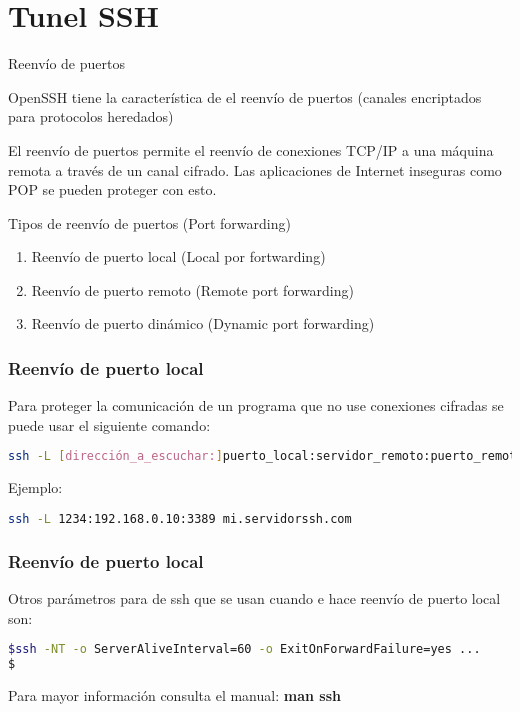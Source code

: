 \section{Tunel SSH}

\begin{frame}[c]{Reenvío de puertos}

  OpenSSH tiene la característica de el reenvío de puertos
  (canales encriptados para protocolos heredados)

  \vspace{\baselineskip}
  El reenvío de puertos permite el reenvío de conexiones TCP/IP a
  una máquina remota a través de un canal cifrado. Las aplicaciones
  de Internet inseguras como POP se pueden proteger con esto.
\end{frame}

\begin{frame}[c]{Tipos de reenvío de puertos (Port forwarding)}
  \begin{enumerate}
    \item Reenvío de puerto local (Local por fortwarding)
    \item Reenvío de puerto remoto (Remote port forwarding)
    \item Reenvío de puerto dinámico (Dynamic port forwarding)
  \end{enumerate}
\end{frame}

\begin{frame}[fragile]
  \frametitle{Reenvío de puerto local}

  Para proteger la comunicación de un programa que no use conexiones
  cifradas se puede usar el siguiente comando:

  \begin{lstlisting}[language=Bash,basicstyle={\footnotesize\ttfamily}]
ssh -L [dirección_a_escuchar:]puerto_local:servidor_remoto:puerto_remoto SERVIDOR
  \end{lstlisting}

  Ejemplo:
  \begin{lstlisting}[language=Bash]
ssh -L 1234:192.168.0.10:3389 mi.servidorssh.com
  \end{lstlisting}
\end{frame}

\begin{frame}[fragile]
  \frametitle{Reenvío de puerto local}

  Otros parámetros para de ssh que se usan cuando e hace reenvío de puerto
  local son:

  \begin{lstlisting}[language=Bash,basicstyle={\footnotesize\ttfamily}]
$ssh -NT -o ServerAliveInterval=60 -o ExitOnForwardFailure=yes ...
$
  \end{lstlisting}

  \vspace{\baselineskip}
  Para mayor información consulta el manual: \textbf{man ssh}

\end{frame}



